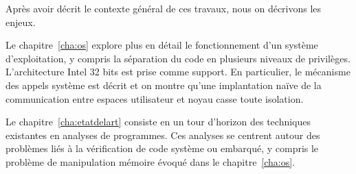 \begin{headingpage}

Après avoir décrit le contexte général de ces travaux, nous on décrivons les
enjeux.

Le chapitre~\ref{cha:os} explore plus en détail le fonctionnement d'un système
d'exploitation, y compris la séparation du code en plusieurs niveaux de
privilèges. L'architecture Intel 32 bits est prise comme support. En
particulier, le mécanisme des appels système est décrit et on montre qu'une
implantation naïve de la communication entre espaces utilisateur et noyau casse
toute isolation.

Le chapitre~\ref{cha:etatdelart} consiste en un tour d'horizon des techniques
existantes en analyses de programmes. Ces analyses se centrent autour des
problèmes liés à la vérification de code système ou embarqué, y compris le
problème de manipulation mémoire évoqué dans le chapitre~\ref{cha:os}.

\end{headingpage}
